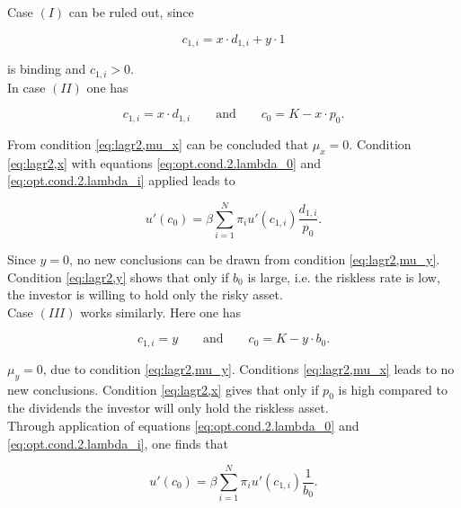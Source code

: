 \noindent Case $(I)$ can be ruled out, since

\begin{equation*}
    c_{1,i} = x \cdot d_{1,i} + y \cdot 1
\end{equation*}

\bigskip

\noindent is binding and $c_{1,i} > 0$. \\

\noindent In case $(II)$ one has

\begin{equation*}
    c_{1,i} = x \cdot d_{1,i} \qquad \text{and} \qquad c_0 = K - x \cdot p_0.
\end{equation*}

\bigskip

\noindent From condition \eqref{eq:lagr2,mu_x} can be concluded that $\mu_x = 0$. Condition \eqref{eq:lagr2,x} with equations \eqref{eq:opt.cond.2.lambda_0} and \eqref{eq:opt.cond.2.lambda_i} applied leads to

\begin{equation}
    u'(c_0) = \beta \sum_{i=1}^{N} \pi_i u'(c_{1,i}) \frac{d_{1,i}}{p_0}.
\end{equation}

\bigskip

\noindent Since $y=0$, no new conclusions can be drawn from condition \eqref{eq:lagr2,mu_y}. Condition \eqref{eq:lagr2,y} shows that only if $b_0$ is large, i.e. the riskless rate is low, the investor is willing to hold only the risky asset.\\

\noindent Case $(III)$ works similarly. Here one has

\begin{equation*}
    c_{1,i} = y \qquad \text{and} \qquad c_0 = K - y \cdot b_0.
\end{equation*}

\bigskip

\noindent $\mu_y = 0$, due to condition \eqref{eq:lagr2,mu_y}. Conditions \eqref{eq:lagr2,mu_x} leads to no new conclusions. Condition \eqref{eq:lagr2,x} gives that only if $p_0$ is high compared to the dividends the investor will only hold the riskless asset.\\
Through application of equations \eqref{eq:opt.cond.2.lambda_0} and \eqref{eq:opt.cond.2.lambda_i}, one finds that

\begin{equation}
    u'(c_0) = \beta \sum_{i=1}^{N} \pi_i u'(c_{1,i}) \frac{1}{b_0}.
\end{equation}

